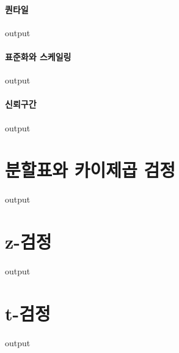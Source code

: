 \documentclass{report}
\begin{document}
\paragraph{퀀타일}
\begin{Schunk}
\begin{Soutput}
output
\end{Soutput}
\end{Schunk}

\paragraph{표준화와 스케일링}
\begin{Schunk}
\begin{Soutput}
output
\end{Soutput}
\end{Schunk}

\paragraph{신뢰구간}
\begin{Schunk}
\begin{Soutput}
output
\end{Soutput}
\end{Schunk}

\section{분할표와 카이제곱 검정}
\begin{Schunk}
\begin{Soutput}
output
\end{Soutput}
\end{Schunk}

\section{z-검정}
\begin{Schunk}
\begin{Soutput}
output
\end{Soutput}
\end{Schunk}

\section{t-검정}
\begin{Schunk}
\begin{Soutput}
output
\end{Soutput}
\end{Schunk}
\end{document}

